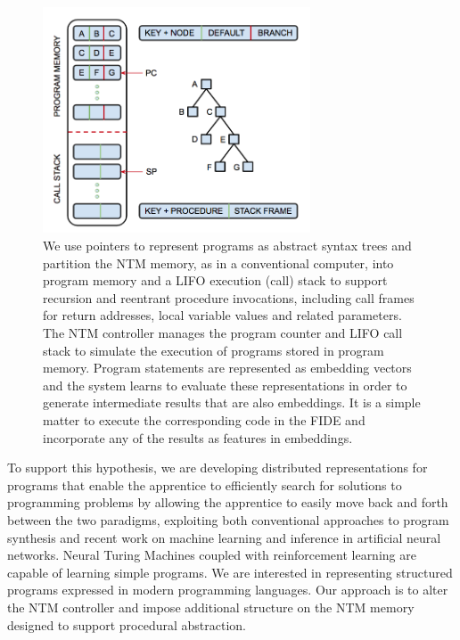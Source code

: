 \begin{figure}
%
  \begin{center} 
    \includegraphics[width=225pt]{./figures/Differentiable_Structured_Programs.png} %
  \end{center}
%
  \caption{We use pointers to represent programs as abstract syntax trees and partition the NTM memory, as in a conventional computer, into program memory and a LIFO execution (call) stack to support recursion and reentrant procedure invocations, including call frames for return addresses, local variable values and related parameters. The NTM controller manages the program counter and LIFO call stack to simulate the execution of programs stored in program memory. Program statements are represented as embedding vectors and the system learns to evaluate these representations in order to generate intermediate results that are also embeddings. It is a simple matter to execute the corresponding code in the FIDE and incorporate any of the results as features in embeddings.}
%
  \label{fig_Differentiable_Structured_Programs}
%
\end{figure}


To support this hypothesis, we are developing distributed representations for programs that enable the apprentice to efficiently search for solutions to programming problems by allowing the apprentice to easily move back and forth between the two paradigms, exploiting both conventional approaches to program synthesis and recent work on machine learning and inference in artificial neural networks. Neural Turing Machines coupled with reinforcement learning are capable of learning simple programs. We are interested in representing structured programs expressed in modern programming languages. Our approach is to alter the NTM controller and impose additional structure on the NTM memory designed to support procedural abstraction. 

